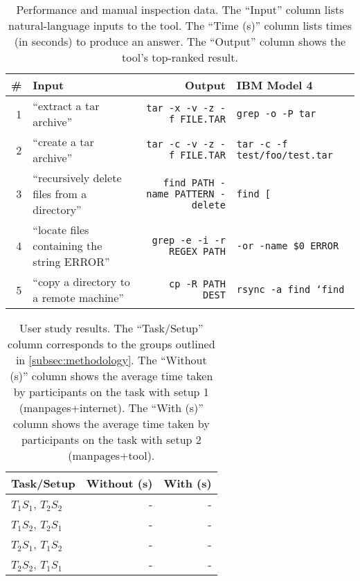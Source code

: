 \begin{table}
    \begin{center}
    \begin{tabular}{rlrl}
        \# & \textbf{Input} & \textbf{Output} &{IBM Model 4}\\
        \hline
        1  & ``extract a tar archive'' & \texttt{tar -x -v -z -f FILE.TAR} & \texttt{grep -o -P tar} \\
        2  & ``create a tar archive''  & \texttt{tar -c -v -z -f FILE.TAR} & \texttt{tar -c -f test/foo/test.tar} \\
        3  & ``recursively delete files from a directory'' & \texttt{find PATH -name PATTERN -delete} & \texttt{find [} \\
        4  & ``locate files containing the string ERROR''  & \texttt{grep -e -i -r REGEX PATH} & \texttt{-or -name \$0 ERROR} \\
        5  & ``copy a directory to a remote machine'' & \texttt{cp -R PATH DEST} & \texttt{rsync -a find `find} \\
    \end{tabular}
    \end{center}
    \caption{Performance and manual inspection data. The ``Input'' column lists
        natural-language inputs to the tool. The ``Time (s)'' column lists times
        (in seconds) to produce an answer. The ``Output'' column shows the
        tool's top-ranked result.}
    \label{tbl:manual-inspection}
\end{table}

\begin{table}
    \begin{center}
    \begin{tabular}{lrr}
        \textbf{Task/Setup} & \textbf{Without (s)} & \textbf{With (s)} \\
        \hline
        $T_1 S_1$, $T_2 S_2$ & - & - \\
        $T_1 S_2$, $T_2 S_1$ & - & - \\
        $T_2 S_1$, $T_1 S_2$ & - & - \\
        $T_2 S_2$, $T_1 S_1$ & - & - \\
    \end{tabular}
    \end{center}
    \caption{User study results. The ``Task/Setup'' column corresponds to the
        groups outlined in \autoref{subsec:methodology}. The ``Without (s)''
        column shows the average time taken by participants on the task with
        setup 1 (manpages+internet). The ``With (s)'' column shows the average
        time taken by participants on the task with setup 2 (manpages+tool).}
\end{table}
